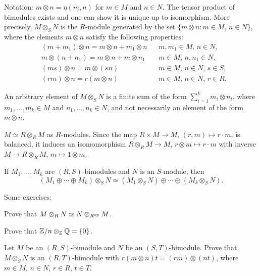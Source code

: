 Notation: $m\otimes n=\eta(m,n)$ for $m\in M$ and $n\in N$.
The tensor product of bimodules exists and one can show it is unique up to isomorphism. More precisely,  $M\otimes_S N$
is the $R$-module generated by 
the set $\{m\otimes n:m\in M,\,n\in N\}$, where the elements $m\otimes n$ satisfy the following properties: 
\begin{align}
    &(m+m_1)\otimes n=m\otimes n+m_1\otimes n &&\text{$m,m_1\in M$, $n\in N$},\\
    &m\otimes(n+n_1)=m\otimes n+m\otimes n_1 &&\text{$m\in M$, $n,n_1\in N$},\\
    &(ms)\otimes n=m\otimes (sn) &&\text{$m\in M$, $n\in N$, $s\in S$},\\
    &(rm)\otimes n=r(m\otimes n) &&\text{$m\in M$, $n\in N$, $r\in R$}.
\end{align}

An arbitrary element of $M\otimes_S N$ is a finite sum of the form 
$\sum_{i=1}^k m_i\otimes n_i$,
where $m_1,\dots,m_k\in M$ and $n_1,\dots,n_k\in N$, and not necessarily an element of the form 
$m\otimes n$. 

\begin{example}
$M\simeq R\otimes_R M$ as $R$-modules. Since the map $R\times M\to M$, $(r,m)\mapsto r\cdot m$, is balanced, it induces an isomomorphism $R\otimes_R M\to M$, $r\otimes m\mapsto r\cdot m$ with inverse $M\to R\otimes_R M$, $m\mapsto 1\otimes m$. 
\end{example}

\begin{example}
If $M_1,\dots,M_k$ are $(R,S)$-bimodules and $N$ is an $S$-module, then
\[
(M_1\oplus\cdots\oplus M_k)\otimes_S N\simeq (M_1\otimes_S N)\oplus\cdots\oplus (M_k\otimes_S N).
\]
\end{example}

Some exercises:

\begin{exercise}
    Prove that  $M\otimes_RN\simeq N\otimes_{R^{\operatorname{op}}}M$.
\end{exercise}

\begin{exercise}
    Prove that  $\mathbb{Z}/n\otimes_{\mathbb{Z}}\mathbb{Q}=\{0\}$.
\end{exercise}

\begin{exercise}
    Let $M$ be an $(R,S)$-bimodule and $N$ be an $(S,T)$-bimodule. 
    Prove that  $M\otimes_SN$ is an $(R,T)$-bimodule 
    with $r(m\otimes n)t=(rm)\otimes (nt)$, 
    where $m\in M$, $n\in N$, $r\in R$, $t\in T$.
\end{exercise}

